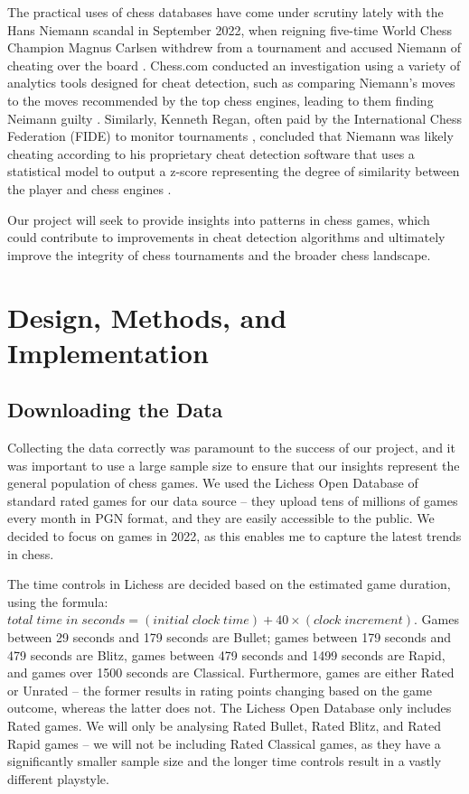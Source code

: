\documentclass[a4paper, 11pt]{article}
\begin{document}
The practical uses of chess databases have come under scrutiny lately with the Hans Niemann scandal in September 2022, when reigning five-time World Chess Champion Magnus Carlsen withdrew from a tournament and accused Niemann of cheating over the board \cite{niemannCheatingAllegations2}. Chess.com conducted an investigation using a variety of analytics tools designed for cheat detection, such as comparing Niemann's moves to the moves recommended by the top chess engines, leading to them finding Neimann guilty \cite{niemannCheatingChessComReport}. Similarly, Kenneth Regan, often paid by the International Chess Federation (FIDE) to monitor tournaments \cite{niemannCheatingReganReport}, concluded that Niemann was likely cheating according to his proprietary cheat detection software that uses a statistical model to output a z-score representing the degree of similarity between the player and chess engines \cite{niemannCheatingReganReport}.

Our project will seek to provide insights into patterns in chess games, which could contribute to improvements in cheat detection algorithms and ultimately improve the integrity of chess tournaments and the broader chess landscape.

\section{Design, Methods, and Implementation}

\subsection{Downloading the Data}
Collecting the data correctly was paramount to the success of our project, and it was important to use a large sample size to ensure that our insights represent the general population of chess games. We used the Lichess Open Database \cite{lichessOpenDatabase} of standard rated games for our data source -- they upload tens of millions of games every month in PGN format, and they are easily accessible to the public. We decided to focus on games in 2022, as this enables me to capture the latest trends in chess.

The time controls in Lichess are decided based on the estimated game duration, using the formula: $total \; time \; in \; seconds = (initial \; clock \; time) + 40 \times (clock \; increment)$. Games between 29 seconds and 179 seconds are Bullet; games between 179 seconds and 479 seconds are Blitz, games between 479 seconds and 1499 seconds are Rapid, and games over 1500 seconds are Classical. Furthermore, games are either Rated or Unrated -- the former results in rating points changing based on the game outcome, whereas the latter does not. The Lichess Open Database only includes Rated games. We will only be analysing Rated Bullet, Rated Blitz, and Rated Rapid games -- we will not be including Rated Classical games, as they have a significantly smaller sample size and the longer time controls result in a vastly different playstyle.
\end{document}
